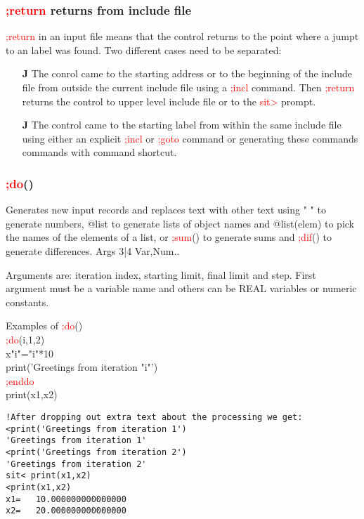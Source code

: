 \subsubsection{\textcolor{Red}{;return} returns from include file}
\label{inpureturn}
\textcolor{Red}{;return} in an input file means that the control returns to the point where a
jumpt to an label was found. Two different cases need to be separated:
\begin{itemize}
\item[\textbf{J}] The conrol came to the starting address or to the beginning of the include file
from outside the current include file using a \textcolor{Red}{;incl} command. Then \textcolor{Red}{;return} returns the control to upper level include
file or to the \textcolor{Red}{sit>} prompt.
\item[\textbf{J}] The control came to the starting label from within the same include file using
either an explicit \textcolor{Red}{;incl} or \textcolor{Red}{;goto} command or generating these commands commands
with command shortcut.
\end{itemize}
\subsubsection{\textcolor{Red}{;do}()}
\label{inpudo}
Generates new input records and replaces text with other text
using " "  to generate numbers, @list to generate lists of object names
and @\textcolor{VioletRed}{list}(elem) to pick the names of the elements of a list, or
\textcolor{Red}{;sum}() to generate sums and \textcolor{Red}{;dif}() to generate differences.
\vspace{0.3cm}
\hline
\vspace{0.3cm}
\noindent Args \tabto{3cm} 3|4 \tabto{5cm}  Var,Num.. \tabto{7cm}
\begin{changemargin}{3cm}{0cm}
\noindent Arguments are: iteration index, starting limit,
final limit and step. First argument must be a variable name and others
can be REAL variables or numeric constants.
\end {changemargin}
\hline
\vspace{0.2cm}
\begin{example}[inpudoex]Examples of \textcolor{Red}{;do}()\\
\label{inpudoex}
\textcolor{Red}{;do}(i,1,2)\\
x"i"="i"*10\\
\textcolor{VioletRed}{print}('Greetings from iteration "i"')\\
\textcolor{Red}{;enddo}\\
\textcolor{VioletRed}{print}(x1,x2)
\color{Green}
\begin{verbatim}
!After dropping out extra text about the processing we get:
<print('Greetings from iteration 1')
'Greetings from iteration 1'
<print('Greetings from iteration 2')
'Greetings from iteration 2'
sit< print(x1,x2)
<print(x1,x2)
x1=   10.000000000000000
x2=   20.000000000000000
\end{verbatim}
\color{Black}
\end{example}

